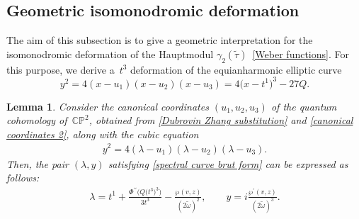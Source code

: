 \documentclass[pdftex]{sigma}
\numberwithin{equation}{section}
\newtheorem{Lemma}[Theorem]{Lemma}
\begin{document}
\subsection{Geometric isomonodromic deformation}\label{Geometric Isomonodromic deformation}

The aim of this subsection is to give a geometric interpretation for the isomonodromic deformation of the Hauptmodul $\gamma_2(\tilde\tau)$~\eqref{Weber functions}. For this purpose, we derive a~$t^3$ deformation of the equianharmonic elliptic curve
\[
y^2=4(x-u_1)(x-u_2)(x-u_3)=4\bigl(x-t^1\bigr)^3-27Q.
\]

\begin{Lemma}
Consider the canonical coordinates $(u_1, u_2, u_3)$ of the quantum cohomology \linebreak of~$\mathbb{CP}^2$, obtained from \eqref{Dubrovin Zhang substitution} and \eqref{canonical coordinates 2}, along with the cubic equation
\begin{gather}\label{spectral curve brut form}
y^2 = 4( \lambda - u_1)( \lambda - u_2)( \lambda - u_3).
\end{gather}
Then, the pair $(\lambda,y)$ satisfying \eqref{spectral curve brut form} can be expressed as follows:
\begin{gather}
\lambda=t^1+\frac{\Phi^{\prime\prime}\bigl(Q\bigl(t^3\bigr)^3\bigr)}{3t^3}-\frac{\wp(v,z)}{(2\tilde\omega)^2},\qquad
y=i\frac{\wp^{\prime}(v,z)}{(2\tilde\omega)^3}.\label{LG superpotential elliptic form first piece}
\end{gather}
\end{Lemma}
\end{document}
